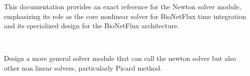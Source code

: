 This documentation provides an exact reference for the Newton solver module, emphasizing its role as the core nonlinear solver for BioNetFlux time integration and its specialized design for the BioNetFlux architecture.

\

\begin{todobox}
	Design a more general solver module that can call the newton solver but also other non linear solvers, particularly Picard method.
\end{todobox}


